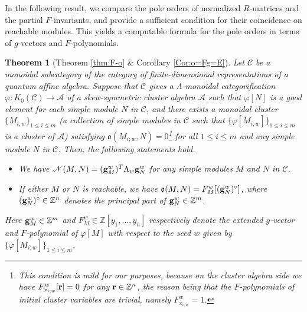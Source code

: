 \documentclass[12pt]{amsart}
\newtheorem{theorem}{Theorem}[section]
\theoremstyle{definition}
\theoremstyle{remark}
\numberwithin{equation}{section}
\begin{document}
In the following result, we compare the pole orders of normalized $R$-matrices and the partial $F$-invariants, and provide a sufficient condition for their coincidence on reachable modules. This yields a computable formula for the pole orders in terms of $g$-vectors and $F$-polynomials. 
\begin{theorem}[Theorem \ref{thm:F-o} \& Corollary \ref{Cor:o=Fg=E}]\label{main-thm:F-o} 
Let $\mathcal C$ be a monoidal subcategory of the category of finite-dimensional representations of a quantum affine algebra.
Suppose that $\mathcal{C}$ gives a $\mathsf{\Lambda}$-monoidal categorification $\varphi \colon K_0(\mathcal{C}) \to \mathcal{A}$ of a skew-symmetric cluster algebra $\mathcal{A}$ such that $\varphi[N]$ is a good element for each simple module $N$ in $\mathcal{C}$, and there exists a monoidal cluster $\{ M_{i;w}\}_{1 \le i \le m}$ (a collection of simple modules in $\mathcal{C}$ such that $\{ \varphi[M_{i;w}]\}_{1 \le i \le m}$ is a cluster of $\mathcal{A}$) satisfying $\mathfrak{o}(M_{i;w}, N) = 0$\footnote{This condition is mild for our purposes, because on the cluster algebra side we have $F_{x_{i;w}}^w[{\bf r}]=0$ for any ${\bf r}\in\mathbb Z^n$, the reason being that the $F$-polynomials of initial cluster variables are trivial, namely
$F_{x_{i;w}}^w=1$.} for all $1 \le i \le m$ and any simple module $N$ in $\mathcal{C}$. Then, the following statements hold.
\begin{itemize}
    \item [(i)] We have $
\mathscr{N}(M,N) = ({\bf g}^{w}_M)^T \Lambda_{w} {\bf g}^{w}_N$ for any simple modules $M$ and $N$ in $\mathcal{C}$.
\item[(ii)] If either $M$ or $N$ is reachable, we have $\mathfrak{o}(M,N) = F_{M}^{w}[({\bf g}^{w}_N)^\circ]$, where $({\bf g}^{w}_N)^\circ\in\mathbb Z^n$ denotes the principal part of ${\bf g}^{w}_N\in\mathbb Z^m$.
\end{itemize} 
Here ${\bf g}^{w}_M\in \mathbb Z^m$ and $F_{M}^{w}\in\mathbb Z[y_1,\ldots,y_n]$ respectively denote the extended $g$-vector and $F$-polynomial of $\varphi[M]$ with respect to the seed $w$ given by $\{ \varphi[M_{i;w}]\}_{1 \le i \le m}$.
\end{theorem}
\end{document}
